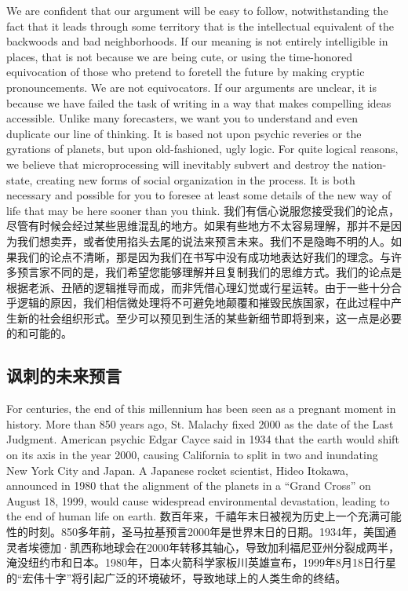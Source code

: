 \begin{Parallel}{97mm}{45mm}
  \ParallelLText
  {We are confident that our argument will be easy to follow, notwithstanding the fact that it leads through some territory that is the intellectual equivalent of the backwoods and bad neighborhoods. If our meaning is not entirely intelligible in places, that is not because we are being cute, or using the time-honored equivocation of those who pretend to foretell the future by making cryptic pronouncements. We are not equivocators. If our arguments are unclear, it is because we have failed the task of writing in a way that makes compelling ideas accessible. Unlike many forecasters, we want you to understand and even duplicate our line of thinking. It is based not upon psychic reveries or the gyrations of planets, but upon old-fashioned, ugly logic. For quite logical reasons, we believe that microprocessing will inevitably subvert and destroy the nation-state, creating new forms of social organization in the process. It is both necessary and possible for you to foresee at least some details of the new way of life that may be here sooner than you think.  }  
  \ParallelRText
  {\small 我们有信心说服您接受我们的论点，尽管有时候会经过某些思维混乱的地方。如果有些地方不太容易理解，那并不是因为我们想卖弄，或者使用掐头去尾的说法来预言未来。我们不是隐晦不明的人。如果我们的论点不清晰，那是因为我们在书写中没有成功地表达好我们的理念。与许多预言家不同的是，我们希望您能够理解并且复制我们的思维方式。我们的论点是根据老派、丑陋的逻辑推导而成，而非凭借心理幻觉或行星运转。由于一些十分合乎逻辑的原因，我们相信微处理将不可避免地颠覆和摧毁民族国家，在此过程中产生新的社会组织形式。至少可以预见到生活的某些新细节即将到来，这一点是必要的和可能的。
}
  \ParallelPar

\subsection{讽刺的未来预言}

  \ParallelLText
  {For centuries, the end of this millennium has been seen as a pregnant moment in history. More than 850 years ago, St. Malachy fixed 2000 as the date of the Last Judgment. American psychic Edgar Cayce said in 1934 that the earth would shift on its axis in the year 2000, causing California to split in two and inundating New York City and Japan. A Japanese rocket scientist, Hideo Itokawa, announced in 1980 that the alignment of the planets in a “Grand Cross” on August 18, 1999, would cause widespread environmental devastation, leading to the end of human life on earth.}  
  \ParallelRText
  {\small 数百年来，千禧年末日被视为历史上一个充满可能性的时刻。850多年前，圣马拉基预言2000年是世界末日的日期。1934年，美国通灵者埃德加·凯西称地球会在2000年转移其轴心，导致加利福尼亚州分裂成两半，淹没纽约市和日本。1980年，日本火箭科学家板川英雄宣布，1999年8月18日行星的“宏伟十字”将引起广泛的环境破坏，导致地球上的人类生命的终结。}
  \ParallelPar



\end{Parallel}
